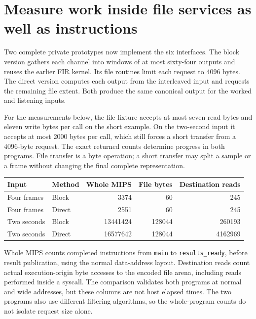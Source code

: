\section{Measure work inside file services as well as instructions}
Two complete private prototypes now implement the six interfaces. The block version
gathers each channel into windows of at most sixty-four outputs and reuses the earlier
FIR kernel. Its file routines limit each request to 4096 bytes. The direct version
computes each output from the interleaved input and requests the remaining file extent.
Both produce the same canonical output for the worked and listening inputs.

For the measurements below, the file fixture accepts at most seven read bytes and
eleven write bytes per call on the short example. On the two-second input it accepts
at most 2000 bytes per call, which still forces a short transfer from a 4096-byte request.
The exact returned counts determine progress in both programs. File transfer is a byte
operation; a short transfer may split a sample or a frame without changing the final
complete representation.

\begin{center}
  \begin{tabular}{llrrr}
    Input       & Method & Whole MIPS & File bytes & Destination reads \\
    \hline
    Four frames & Block  & 3374       & 60         & 245               \\
    Four frames & Direct & 2551       & 60         & 245               \\
    Two seconds & Block  & 13441424   & 128044     & 260193            \\
    Two seconds & Direct & 16577642   & 128044     & 4162969           \\
  \end{tabular}
\end{center}

Whole MIPS counts completed instructions from \texttt{main} to
\texttt{results\_ready}, before result publication, using the normal data-address
layout. Destination reads count actual execution-origin byte accesses to the encoded
file arena, including reads performed inside a syscall. The comparison validates both
programs at normal and wide addresses, but these columns are not host elapsed times.
The two programs also use different filtering algorithms, so the whole-program counts
do not isolate request size alone.

